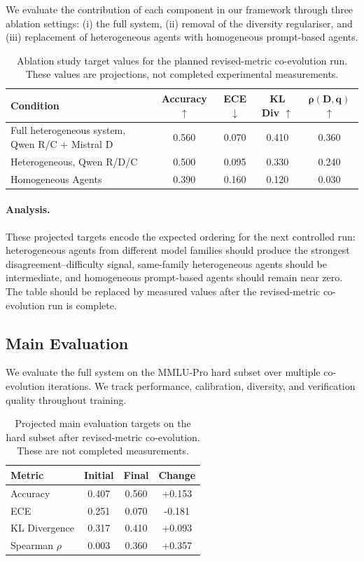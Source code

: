 \documentclass{article}
\begin{document}
We evaluate the contribution of each component in our framework through three ablation settings: (i) the full system, (ii) removal of the diversity regulariser, and (iii) replacement of heterogeneous agents with homogeneous prompt-based agents.

\begin{table}[h]
\centering
\caption{Ablation study target values for the planned revised-metric co-evolution run. These values are projections, not completed experimental measurements.}
\label{tab:ablation}
\begin{tabular}{lcccc}
\toprule
\textbf{Condition} & \textbf{Accuracy} $\uparrow$ & \textbf{ECE} $\downarrow$ & \textbf{KL Div} $\uparrow$ & $\boldsymbol{\rho(D,q)}$ $\uparrow$ \\
\midrule
Full heterogeneous system, Qwen R/C + Mistral D & 0.560 & 0.070 & 0.410 & 0.360 \\
Heterogeneous, Qwen R/D/C & 0.500 & 0.095 & 0.330 & 0.240 \\
Homogeneous Agents & 0.390 & 0.160 & 0.120 & 0.030 \\
\bottomrule
\end{tabular}
\end{table}

\paragraph{Analysis.}
These projected targets encode the expected ordering for the next controlled run: heterogeneous agents from different model families should produce the strongest disagreement--difficulty signal, same-family heterogeneous agents should be intermediate, and homogeneous prompt-based agents should remain near zero. The table should be replaced by measured values after the revised-metric co-evolution run is complete.

\subsection{Main Evaluation}

We evaluate the full system on the MMLU-Pro hard subset over multiple co-evolution iterations. We track performance, calibration, diversity, and verification quality throughout training.

\begin{table}[h]
\centering
\caption{Projected main evaluation targets on the hard subset after revised-metric co-evolution. These are not completed measurements.}
\label{tab:main_results}
\begin{tabular}{lccc}
\toprule
\textbf{Metric} & \textbf{Initial} & \textbf{Final} & \textbf{Change} \\
\midrule
Accuracy & 0.407 & 0.560 & +0.153 \\
ECE & 0.251 & 0.070 & -0.181 \\
KL Divergence & 0.317 & 0.410 & +0.093 \\
Spearman $\rho$ & 0.003 & 0.360 & +0.357 \\
\bottomrule
\end{tabular}
\end{table}
\end{document}
